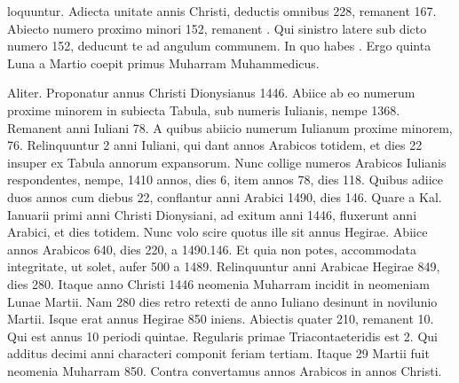 loquuntur.
Adiecta unitate annis Christi, deductis omnibus 228, remanent
167.
Abiecto numero proximo minori 152, remanent .
Qui sinistro latere sub dicto numero 152, deducunt te ad angulum
communem.
In quo habes .
Ergo quinta Luna a Martio coepit primus
Muharram Muhammedicus.
\begin{table}[tbp]
  
\end{table}
\begin{table}[tbp]
  
\end{table}
Aliter.
Proponatur annus Christi
Dionysianus 1446.
Abiice ab eo numerum proxime minorem in
subiecta Tabula, sub numeris Iulianis, nempe 1368.
Remanent
anni Iuliani 78.
A quibus
abiicio numerum Iulianum
proxime minorem,
76.
Relinquuntur 2
anni Iuliani, qui dant annos
Arabicos totidem, et
dies 22 insuper ex Tabula
annorum expansorum.
Nunc collige numeros
Arabicos Iulianis respondentes,
nempe, 1410 annos,
dies 6, item annos
78, dies 118.
Quibus adiice
duos annos cum diebus
22, conflantur anni
Arabici 1490, dies 146.
Quare a Kal. %
 Ianuarii primi
anni Christi Dionysiani,
ad exitum %
 anni 1446,
fluxerunt anni Arabici, et
dies totidem.
Nunc volo
scire quotus ille sit annus
Hegirae.
Abiice annos
Arabicos 640, dies 220,
a 1490.146.
Et quia non
potes, accommodata integritate, ut solet, aufer 500 a 1489.
Relinquuntur
anni Arabicae Hegirae 849, dies 280.
Itaque anno Christi 1446
neomenia Muharram incidit in neomeniam Lunae
Martii.
%
Nam 280 dies retro retexti de anno Iuliano
 desinunt in novilunio
Martii.
Isque erat annus Hegirae 850 iniens.
Abiectis quater
210, remanent 10.
Qui est annus 10 periodi quintae.
Regularis
primae Triacontaeteridis est 2.
Qui additus decimi anni characteri
componit feriam tertiam.
Itaque 29 Martii fuit neomenia Muharram
850.
Contra convertamus annos Arabicos in annos Christi.
